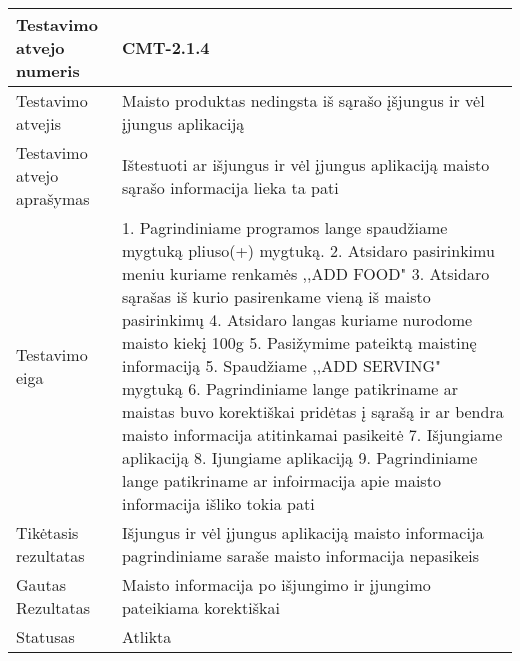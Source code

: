 \documentclass[oneside]{VUMIFPSkursinis}
\begin{document}
\begin{center}
    \begin{tabular}{ |p{5cm}|p{13cm}|}
    \hline
        Testavimo atvejo numeris & CMT-2.1.4  \\ \hline
        Testavimo atvejis & Maisto produktas nedingsta iš sąrašo įšjungus ir vėl įjungus aplikaciją  \\ \hline
        Testavimo atvejo aprašymas & Ištestuoti ar išjungus ir vėl įjungus aplikaciją maisto sąrašo informacija lieka ta pati  \\ \hline
        Testavimo eiga &  1. Pagrindiniame programos lange spaudžiame mygtuką pliuso(+) mygtuką. 
				2. Atsidaro pasirinkimu meniu kuriame renkamės ,,ADD FOOD"
				3. Atsidaro sąrašas iš kurio pasirenkame vieną iš maisto pasirinkimų
				4. Atsidaro langas kuriame nurodome maisto kiekį 100g
				5. Pasižymime pateiktą maistinę informaciją
				5. Spaudžiame ,,ADD SERVING"  mygtuką
				6. Pagrindiniame lange patikriname ar maistas buvo korektiškai pridėtas į sąrašą ir ar bendra maisto informacija atitinkamai pasikeitė 
				7. Išjungiame aplikaciją
				8. Ijungiame aplikaciją
				9. Pagrindiniame lange patikriname ar infoirmacija apie maisto informacija išliko tokia pati\\ \hline
        Tikėtasis rezultatas &  Išjungus ir vėl įjungus aplikaciją maisto informacija pagrindiniame saraše maisto informacija nepasikeis\\ \hline
        Gautas Rezultatas & Maisto informacija po išjungimo ir įjungimo pateikiama korektiškai  \\ \hline
        Statusas & Atlikta  \\ \hline
    \hline
    \end{tabular}
\end{center}
\end{document}

